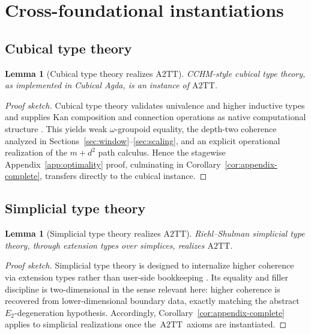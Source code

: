\documentclass{lmcs}
\theoremstyle{plain}
\newtheorem{lem}[thm]{Lemma}
\theoremstyle{definition}
\theoremstyle{remark}
\newcommand{\ATwo}{\ensuremath{\mathrm{A2TT}}}
\begin{document}
\section{Cross-foundational instantiations}
\label{sec:inst}

\subsection{Cubical type theory}

\begin{lem}[Cubical type theory realizes \ATwo]
\label{lem:cubical}
CCHM-style cubical type theory, as implemented in Cubical Agda, is an instance of \ATwo.
\end{lem}

\begin{proof}[Proof sketch]
Cubical type theory validates univalence and higher inductive types and supplies Kan composition and connection operations as native computational structure \cite{cchm,cubical-agda}.
This yields weak $\omega$-groupoid equality, the depth-two coherence analyzed in Sections~\ref{sec:window}--\ref{sec:scaling}, and an explicit operational realization of the $m+d^2$ path calculus.
Hence the stagewise Appendix~\ref{app:optimality} proof, culminating in Corollary~\ref{cor:appendix-complete}, transfers directly to the cubical instance.
\end{proof}

\subsection{Simplicial type theory}

\begin{lem}[Simplicial type theory realizes \ATwo]
\label{lem:simplicial}
Riehl--Shulman simplicial type theory, through extension types over simplices, realizes \ATwo.
\end{lem}

\begin{proof}[Proof sketch]
Simplicial type theory is designed to internalize higher coherence via extension types rather than user-side bookkeeping \cite{riehl-shulman-synthetic}.
Its equality and filler discipline is two-dimensional in the sense relevant here: higher coherence is recovered from lower-dimensional boundary data, exactly matching the abstract $E_2$-degeneration hypothesis.
Accordingly, Corollary~\ref{cor:appendix-complete} applies to simplicial realizations once the \,\ATwo\, axioms are instantiated.
\end{proof}
\end{document}
